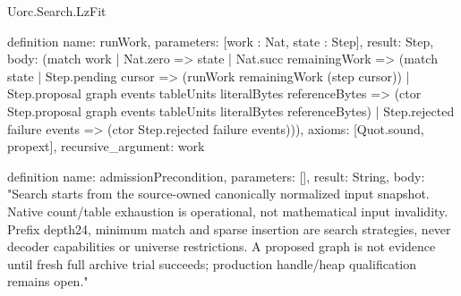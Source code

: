 \begin{lexlean}{Uorc.Search.LzFit}
\begin{semanticmodule}
definition{
  name: runWork,
  parameters: [work : Nat, state : Step],
  result: Step,
  body: (match work
    | Nat.zero => state
    | Nat.succ remainingWork => (match state
      | Step.pending cursor => (runWork remainingWork (step cursor))
      | Step.proposal graph events tableUnits literalBytes referenceBytes => (ctor Step.proposal graph events tableUnits literalBytes referenceBytes)
      | Step.rejected failure events => (ctor Step.rejected failure events))),
  axioms: [Quot.sound, propext],
  recursive_argument: work
}

definition{
  name: admissionPrecondition,
  parameters: [],
  result: String,
  body: "Search starts from the source-owned canonically normalized input snapshot. Native count/table exhaustion is operational, not mathematical input invalidity. Prefix depth24, minimum match and sparse insertion are search strategies, never decoder capabilities or universe restrictions. A proposed graph is not evidence until fresh full archive trial succeeds; production handle/heap qualification remains open."
}
\end{semanticmodule}
\end{lexlean}
